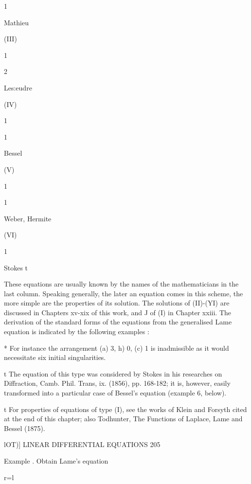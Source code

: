 1 


Mathieu 


(III) 


1 


2 





Les:eudre 


(IV) 





1 


1 


Bessel 


(V) 


1 





1 


Weber, Hermite 


(VI) 








1 


Stokes t 



These equations are usually known by the names of the mathematicians 
in the last column. Speaking generally, the later an equation comes in 
this scheme, the more simple are the properties of its solution. The 
solutions of (II)-(YI) are discussed in Chapters xv-xix of this work, and J 
of (I) in Chapter xxiii. The derivation of the standard forms of the equations 
from the generalised Lame equation is indicated by the following examples : 

* For instance the arrangement (a) 3,  h) 0, (c) 1 is inadmissible as it would necessitate six 
initial singularities. 

t The equation of this type was considered by Stokes in his researches on Diffraction, 
Camb. Phil. Trans, ix. (1856), pp. 168-182; it is, however, easily transformed into a particular 
case of Bessel's equation (example 6, below). 

t For properties of equations of type (I), see the works of Klein and Forsyth cited at the 
end of this chapter; also Todhunter, The Functions of Laplace, Lame and Bessel (1875). 



lOT)] LINEAR DIFFERENTIAL EQUATIONS 205 

Example .  Obtain Lame's equation 

r=l 

